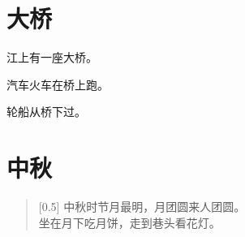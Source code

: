 \documentclass[12pt,UTF-8,openany]{ctexbook}
\begin{document}
\chapter{大桥}

\begin{large}
    
    江上有一座大桥。
    
    汽车火车在桥上跑。
    
    轮船从桥下过。
    
\end{large}


\clearpage

\begin{center}
    
\end{center}


\hanzibox{}\hanzibox{}\hanzibox{}\hanzibox{}\hspace{1em}\hanzibox{}\hanzibox{}\hanzibox{}\hanzibox{}

\hanzibox{}\hanzibox{}\hanzibox{}\hanzibox{}\hspace{1em}\hanzibox{}\hanzibox{}\hanzibox{}\hanzibox{}

\hanzibox{}\hanzibox{}\hanzibox{}\hanzibox{}\hspace{1em}\hanzibox{}\hanzibox{}\hanzibox{}\hanzibox{}






\chapter{中秋}

\begin{large}
    
    \begin{verse}[0.5\linewidth]
        中秋时节月最明，月团圆来人团圆。 \\
        坐在月下吃月饼，走到巷头看花灯。
    \end{verse}
    
\end{large}


\clearpage

\begin{center}
    
\end{center}
\end{document}

